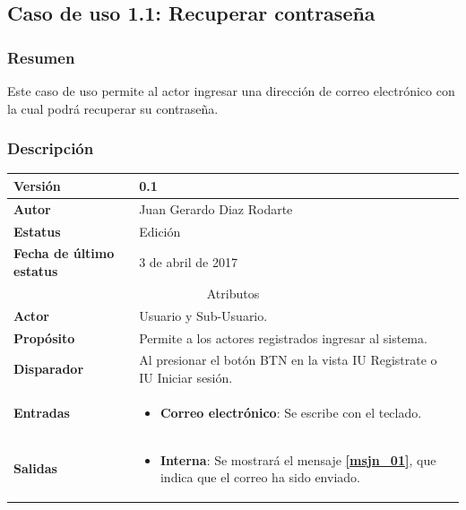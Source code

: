 \subsection{Caso de uso 1.1: Recuperar contraseña} \label{cu1_1}
\subsubsection{Resumen}
Este caso de uso permite al actor ingresar una dirección de correo electrónico con la cual podrá recuperar su contraseña.
\subsubsection{Descripción}
\begingroup
\setlength{\LTleft}{-10cm plus -1fill}
\setlength{\LTright}{\LTleft}
\begin{center}
    \addtocounter{table}{-1}
     \label{tab:cu1_1_tab}
	\begin{longtable}{| p{3.5cm} | p{11.5cm} |}
      	\hline
      		\textbf{Versión} &  0.1 \\
        \hline 
       		\textbf{Autor} & Juan Gerardo Diaz Rodarte\\
        \hline
          \textbf{Estatus} & Edición \\
        \hline  
          \textbf{Fecha de último estatus} &  3 de abril de 2017 \\
        \hline
      \multicolumn{2}{|c|}{\large{Atributos}} \\
        \hline
          \textbf{Actor} & Usuario y Sub-Usuario. \\
        \hline	
          \textbf{Propósito} & Permite a los actores registrados ingresar al sistema. \\
        \hline
          \textbf{Disparador} & Al presionar el botón BTN en la vista IU Registrate o IU Iniciar sesión. \\
        \hline	
          \textbf{Entradas} & 
            \begin{itemize}
              \item \textbf{Correo electrónico}: Se escribe con el teclado.
            \end{itemize} \\
        \hline	
          \textbf{Salidas} & 
            \begin{itemize}
              \item \textbf{Interna}: Se mostrará el mensaje \textbf{\ref{msjn_01}}, que indica que el correo ha sido enviado.
            \end{itemize} \\

\end{longtable}
\end{center}

